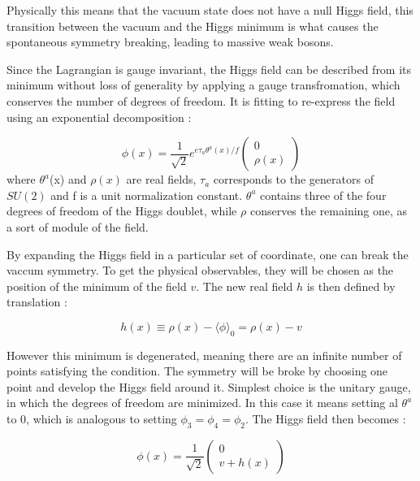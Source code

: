 Physically this means that the vacuum state does not have a null Higgs field, this transition between the vacuum and the Higgs minimum is what causes the spontaneous symmetry breaking, leading to massive weak bosons.

Since the Lagrangian is gauge invariant, the Higgs field can be described from its minimum without loss of generality by applying a gauge transfromation, which conserves the number of degrees of freedom. It is fitting to re-express the field using an exponential decomposition :

\begin{equation}
    \phi(x) = \frac{1}{\sqrt{2}}e^{e\tau_a \theta^a (x) / f} \begin{pmatrix} 0 \\ \rho(x) \end{pmatrix}
\end{equation}
where $\theta^a$(x) and $\rho(x)$ are real fields, $\tau_a$ corresponds to the generators of $SU(2)$ and f is a unit normalization constant. $\theta^a$ contains three of the four degrees of freedom of the Higgs doublet, while $\rho$ conserves the remaining one, as a sort of module of the field.\newline

By expanding the Higgs field in a particular set of coordinate, one can break the vaccum symmetry. To get the physical observables, they will be chosen as the position of the minimum of the field $v$. The new real field $h$ is then defined by translation :

\begin{equation}
    h(x) \equiv \rho (x) - \langle \phi \rangle_0 = \rho(x) - v
\end{equation}

However this minimum is degenerated, meaning there are an infinite number of points satisfying the condition. The symmetry will be broke by choosing one point and develop the Higgs field around it. Simplest choice is the unitary gauge, in which the degrees of freedom are minimized. In this case it means setting al $\theta^a$ to 0, which is analogous to setting $\phi_3 = \phi_4 = \phi_2$. The Higgs field then becomes :

\begin{equation}
    \phi(x) = \frac{1}{\sqrt{2}} \begin{pmatrix} 0 \\ v + h(x) \end{pmatrix}
    \label{eq:simphiggsfield}
\end{equation}

